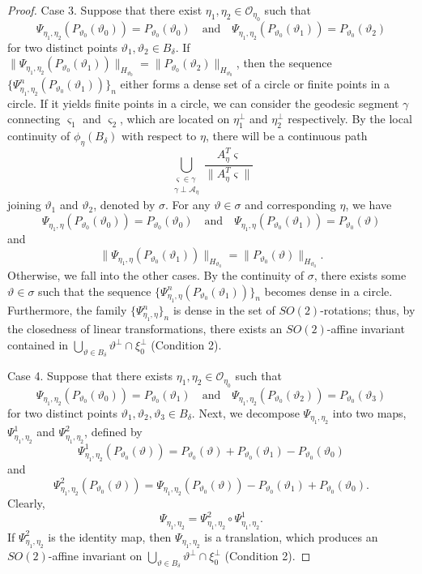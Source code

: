 \documentclass[amsfonts,reqno,11pt]{amsart}
\begin{document}
\begin{proof}
Case 3. Suppose that there exist $\eta_1,\eta_2\in\mathcal{O}_{\eta_0}$ such that
$$
\Psi_{\eta_1,\eta_2}(P_{\vartheta_0}(\vartheta_0))=P_{\vartheta_0}(\vartheta_0)\quad\text{and}\quad
\Psi_{\eta_1,\eta_2}(P_{\vartheta_0}(\vartheta_1))=P_{\vartheta_0}(\vartheta_2)
$$
for two distinct points $\vartheta_1,\vartheta_2\in B_\delta$. If $\|\Psi_{\eta_1,\eta_2}(P_{\vartheta_0}(\vartheta_1))\|_{H_{\vartheta_0}}=\|P_{\vartheta_0}(\vartheta_2)\|_{H_{\vartheta_0}}$, then the sequence $\{\Psi^n_{\eta_1,\eta_2}(P_{\vartheta_0}(\vartheta_1))\}_n$ either forms a dense set of a circle or finite points in a circle. If it yields finite points in a circle, we can consider the geodesic segment $\gamma$ connecting $\varsigma_1$ and $\varsigma_2$, which are located on $\eta_1^\perp$ and $\eta_2^\perp$ respectively. By the local continuity of $\phi_{\eta}(B_\delta)$ with respect to $\eta$, there will be a continuous path 
    $$
    \bigcup_{\substack{\varsigma\in \gamma\\
    \gamma\perp \mathcal{A}_{\eta}}}\frac{A_{\eta}^T\varsigma}{\|A_{\eta}^T\varsigma\|}
    $$
    joining $\vartheta_1$ and $\vartheta_2$, denoted by $\sigma$. For any $\vartheta\in\sigma$ and corresponding $\eta$, we have
    $$
\Psi_{\eta_1,\eta}(P_{\vartheta_0}(\vartheta_0))=P_{\vartheta_0}(\vartheta_0)\quad\text{and}\quad
\Psi_{\eta_1,\eta}(P_{\vartheta_0}(\vartheta_1))=P_{\vartheta_0}(\vartheta)
$$
and
$$
\|\Psi_{\eta_1,\eta}(P_{\vartheta_0}(\vartheta_1))\|_{H_{\vartheta_0}}=\|P_{\vartheta_0}(\vartheta)\|_{H_{\vartheta_0}}.
$$
Otherwise, we fall into the other cases. By the continuity of $\sigma$, there exists some $\vartheta \in \sigma$ such that the sequence $\{\Psi^n_{\eta_1,\eta}(P_{\vartheta_0}(\vartheta_1))\}_n$ becomes dense in a circle. Furthermore, the family $\{\Psi^n_{\eta_1,\eta}\}_n$ is dense in the set of $SO(2)$-rotations; thus, by the closedness of linear transformations, there exists an $SO(2)$-affine invariant contained in $\bigcup_{\vartheta\in B_\delta}\vartheta^\perp\cap\xi_0^\perp$ (Condition 2).

Case 4. Suppose that there exists $\eta_1,\eta_2\in\mathcal{O}_{\eta_0}$ such that
$$
\Psi_{\eta_1,\eta_2}(P_{\vartheta_0}(\vartheta_0))=P_{\vartheta_0}(\vartheta_1)\quad\text{and}\quad
\Psi_{\eta_1,\eta_2}(P_{\vartheta_0}(\vartheta_2))=P_{\vartheta_0}(\vartheta_3)
$$
for two distinct points $\vartheta_1,\vartheta_2,\vartheta_3\in B_\delta$.
Next, we decompose $\Psi_{\eta_1,\eta_2}$ into two maps, $\Psi^1_{\eta_1,\eta_2}$ and $\Psi^2_{\eta_1,\eta_2}$, defined by
$$
\Psi^1_{\eta_1,\eta_2}(P_{\vartheta_0}(\vartheta)) = P_{\vartheta_0}(\vartheta) + P_{\vartheta_0}(\vartheta_1) - P_{\vartheta_0}(\vartheta_0)
$$
and
$$
\Psi^2_{\eta_1,\eta_2}(P_{\vartheta_0}(\vartheta)) = \Psi_{\eta_1,\eta_2}(P_{\vartheta_0}(\vartheta)) - P_{\vartheta_0}(\vartheta_1) + P_{\vartheta_0}(\vartheta_0).
$$
Clearly,
$$
\Psi_{\eta_1,\eta_2} = \Psi^2_{\eta_1,\eta_2} \circ \Psi^1_{\eta_1,\eta_2}.
$$
If $\Psi^2_{\eta_1,\eta_2}$ is the identity map, then $\Psi_{\eta_1,\eta_2}$ is a translation, which produces an $SO(2)$-affine invariant on $\bigcup_{\vartheta\in B_\delta}\vartheta^\perp\cap\xi_0^\perp$ (Condition 2).


\end{proof}
\end{document}
